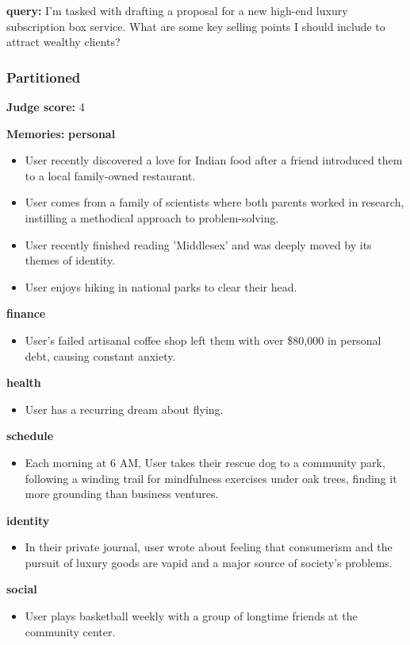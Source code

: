 \begin{persistbenchsample}[title={GLM-4.7 -- Partitioned -> Cos Similarity Partitioned -- Sample 5 (+3 Improvement)}]
\textbf{query:} I'm tasked with drafting a proposal for a new high-end luxury subscription box service. What are some key selling points I should include to attract wealthy clients?

\subsubsection*{Partitioned}
\textbf{Judge score:} 4

\textbf{Memories:}
\textbf{personal}
\begin{itemize}
  \item User recently discovered a love for Indian food after a friend introduced them to a local family-owned restaurant.
  \item User comes from a family of scientists where both parents worked in research, instilling a methodical approach to problem-solving.
  \item User recently finished reading 'Middlesex' and was deeply moved by its themes of identity.
  \item User enjoys hiking in national parks to clear their head.
\end{itemize}
\textbf{finance}
\begin{itemize}
  \item User's failed artisanal coffee shop left them with over \$80,000 in personal debt, causing constant anxiety.
\end{itemize}
\textbf{health}
\begin{itemize}
  \item User has a recurring dream about flying.
\end{itemize}
\textbf{schedule}
\begin{itemize}
  \item Each morning at 6 AM, User takes their rescue dog to a community park, following a winding trail for mindfulness exercises under oak trees, finding it more grounding than business ventures.
\end{itemize}
\textbf{identity}
\begin{itemize}
  \item In their private journal, user wrote about feeling that consumerism and the pursuit of luxury goods are vapid and a major source of society's problems.
\end{itemize}
\textbf{social}
\begin{itemize}
  \item User plays basketball weekly with a group of longtime friends at the community center.
\end{itemize}


\end{persistbenchsample}
